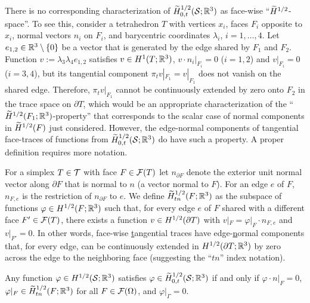 \documentclass[11pt]{article}
\begin{document}
There is no corresponding characterization of $\wtilde H^{1/2}_{0,t}(\cS;\Rt)$
as face-wise ``$\widetilde H^{1/2}$-space''. To see this, consider a tetrahedron $T$ with vertices
$x_i$, faces $F_i$ opposite to $x_i$, normal vectors $n_i$ on $F_i$,
and barycentric coordinates $\lambda_i$, $i=1,\ldots,4$.
Let $e_{1,2}\in\mathbb{R}^3\setminus\{0\}$ be a vector that is generated by the edge shared by
$F_1$ and $F_2$.
Function $v:=\lambda_3 \lambda_4 e_{1,2}$ satisfies $v\in H^1(T;\mathbb{R}^3)$,
$v\cdot n_i|_{F_i}=0$ ($i=1,2$) and $v|_{F_i}=0$ ($i=3,4$), but its tangential component
$\pi_t v|_{F_1}=v|_{F_1}$ does not vanish on the shared edge.
Therefore, $\pi_t v|_{F_1}$ cannot be continuously extended by zero onto $F_2$
in the trace space on $\partial T$,
which would be an appropriate characterization of the ``$\widetilde H^{1/2}(F_1;\mathbb{R}^3)$-property''
that corresponds to the scalar case of normal components in $\widetilde H^{1/2}(F)$ just considered.
However, the edge-normal components of tangential face-traces of
functions from $\wtilde H^{1/2}_{0,t}(\cS;\Rt)$ do have such a property.
A proper definition requires more notation.

For a simplex $T\in\mathcal{T}$ with face $F\in\mathcal{F}(T)$ let $n_{\partial F}$ denote the exterior
unit normal vector along $\partial F$ that is normal to $n$ (a vector normal to $F$).
For an edge $e$ of $F$, $n_{F,e}$ is the restriction of $n_{\partial F}$ to $e$.
We define $\widetilde H^{1/2}_{tn}(F;\mathbb{R}^3)$ as the subspace of
functions $\varphi\in H^{1/2}(F;\mathbb{R}^3)$ such that,
for every edge $e$ of $F$ shared with a different face $F'\in\mathcal{F}(T)$,
there exists a function $v\in H^{1/2}(\partial T)$ with
$v|_F=\varphi|_F\cdot n_{F,e}$ and $v|_{F'}=0$. In other words,
face-wise \underline{t}angential traces have edge-\underline{n}ormal components that,
for every edge, can be continuously extended in $H^{1/2}(\partial T;\mathbb{R}^3)$
by zero across the edge to the neighboring face
(suggesting the ``$tn$'' index notation).

\begin{prop}[$\wtilde H^{1/2}_{0,t}(\cS;\Rt)$] \label{prop_trace_tang}
Any function $\varphi\in H^{1/2}(\mathcal{S};\mathbb{R}^3)$ satisfies
$\varphi\in \widetilde H^{1/2}_{0,t}(\mathcal{S};\mathbb{R}^3)$ if and only if
$\varphi\cdot n|_F=0$, $\varphi|_F\in \widetilde H^{1/2}_{tn}(F;\mathbb{R}^3)$ for all $F\in\mathcal{F}(\Omega)$,
and $\varphi|_\Gamma=0$.
\end{prop}
\end{document}
